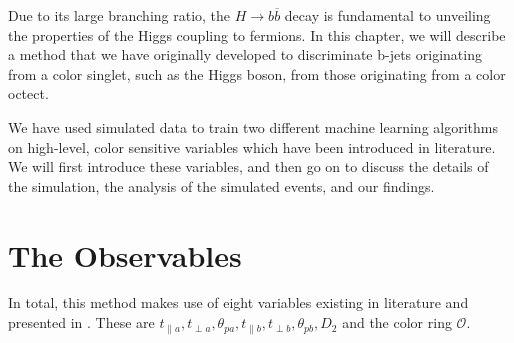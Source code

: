 \documentclass[10pt,a4paper]{book}
\begin{document}
Due to its large branching ratio, the $H\rightarrow b\overline{b}$ decay is fundamental to unveiling the properties of the Higgs coupling to fermions. In this chapter, we will describe a method that we have originally developed to discriminate b-jets originating from a color singlet, such as the Higgs boson, from those originating from a color octect. 

We have used simulated data to train two different machine learning algorithms on high-level, color sensitive variables which have been introduced in literature. We will first introduce these variables, and then go on to discuss the details of the simulation, the analysis of the simulated events, and our findings.


\section{The Observables}
In total, this method makes use of eight variables existing in literature and presented in \cite{Larkoski:2019fsm, Larkoski:2014gra, Buckley:2020kdp}. These are $t_{\parallel a}, t_{\perp a}, \theta_{pa}, t_{\parallel b}, t_{\perp b}, \theta_{pb}, D_2$ and the color ring $\mathcal{O}$.
\end{document}
